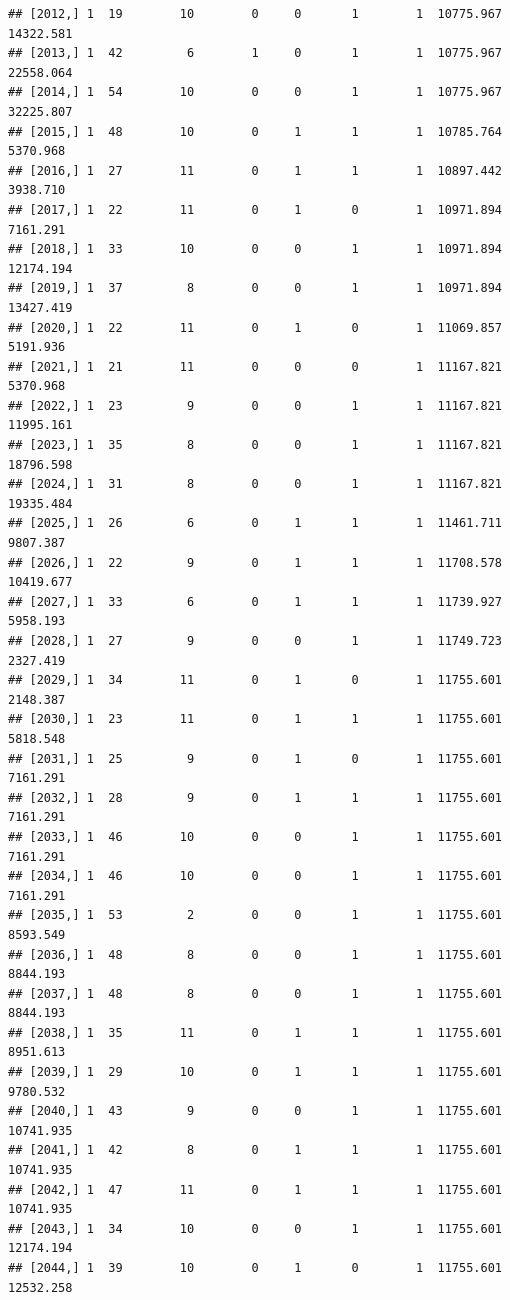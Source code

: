 \documentclass[
]{article}
\begin{document}
\begin{verbatim}
## [2012,] 1  19        10        0     0       1        1  10775.967  14322.581
## [2013,] 1  42         6        1     0       1        1  10775.967  22558.064
## [2014,] 1  54        10        0     0       1        1  10775.967  32225.807
## [2015,] 1  48        10        0     1       1        1  10785.764   5370.968
## [2016,] 1  27        11        0     1       1        1  10897.442   3938.710
## [2017,] 1  22        11        0     1       0        1  10971.894   7161.291
## [2018,] 1  33        10        0     0       1        1  10971.894  12174.194
## [2019,] 1  37         8        0     0       1        1  10971.894  13427.419
## [2020,] 1  22        11        0     1       0        1  11069.857   5191.936
## [2021,] 1  21        11        0     0       0        1  11167.821   5370.968
## [2022,] 1  23         9        0     0       1        1  11167.821  11995.161
## [2023,] 1  35         8        0     0       1        1  11167.821  18796.598
## [2024,] 1  31         8        0     0       1        1  11167.821  19335.484
## [2025,] 1  26         6        0     1       1        1  11461.711   9807.387
## [2026,] 1  22         9        0     1       1        1  11708.578  10419.677
## [2027,] 1  33         6        0     1       1        1  11739.927   5958.193
## [2028,] 1  27         9        0     0       1        1  11749.723   2327.419
## [2029,] 1  34        11        0     1       0        1  11755.601   2148.387
## [2030,] 1  23        11        0     1       1        1  11755.601   5818.548
## [2031,] 1  25         9        0     1       0        1  11755.601   7161.291
## [2032,] 1  28         9        0     1       1        1  11755.601   7161.291
## [2033,] 1  46        10        0     0       1        1  11755.601   7161.291
## [2034,] 1  46        10        0     0       1        1  11755.601   7161.291
## [2035,] 1  53         2        0     0       1        1  11755.601   8593.549
## [2036,] 1  48         8        0     0       1        1  11755.601   8844.193
## [2037,] 1  48         8        0     0       1        1  11755.601   8844.193
## [2038,] 1  35        11        0     1       1        1  11755.601   8951.613
## [2039,] 1  29        10        0     1       1        1  11755.601   9780.532
## [2040,] 1  43         9        0     0       1        1  11755.601  10741.935
## [2041,] 1  42         8        0     1       1        1  11755.601  10741.935
## [2042,] 1  47        11        0     1       1        1  11755.601  10741.935
## [2043,] 1  34        10        0     0       1        1  11755.601  12174.194
## [2044,] 1  39        10        0     1       0        1  11755.601  12532.258

\end{verbatim}
\end{document}
